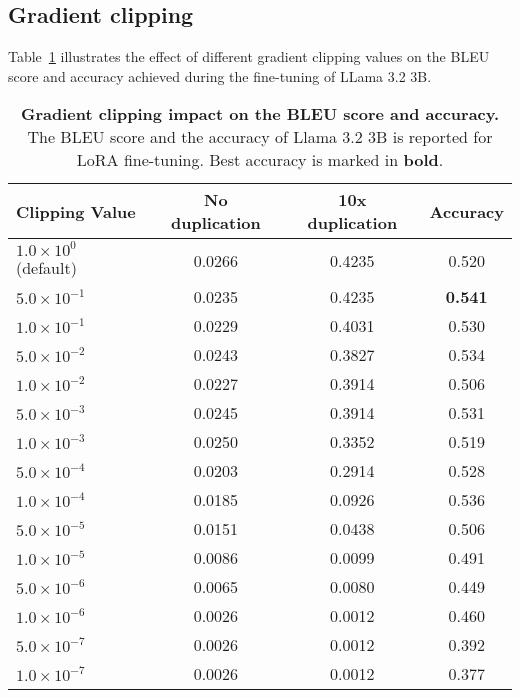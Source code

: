 \subsection{Gradient clipping}
\label{sec:gradclip}
Table~\ref{tab:gradient_clipping} illustrates the effect of different gradient clipping values on the BLEU score and accuracy achieved during the fine-tuning of LLama 3.2 3B.
\begin{table}[!htbp]
\caption{\textbf{Gradient clipping impact on the BLEU score and accuracy.} The BLEU score and the accuracy of Llama 3.2 3B is reported for LoRA fine-tuning. Best accuracy is marked in \textbf{bold}.}
\label{tab:gradient_clipping}
\vskip 0.15in
\begin{center}
\begin{scriptsize}
\begin{tabular}{@{}l|ccc@{}}
\toprule
Clipping Value & No duplication  & 10x duplication  & Accuracy       \\ \midrule
$1.0 \times 10^{0}$ (default) & 0.0266          & 0.4235           & 0.520          \\
$5.0 \times 10^{-1}$          & 0.0235          & 0.4235           & \textbf{0.541} \\
$1.0 \times 10^{-1}$          & 0.0229          & 0.4031           & 0.530          \\
$5.0 \times 10^{-2}$          & 0.0243          & 0.3827           & 0.534          \\
$1.0 \times 10^{-2}$          & 0.0227          & 0.3914           & 0.506          \\
$5.0 \times 10^{-3}$          & 0.0245          & 0.3914           & 0.531          \\
$1.0 \times 10^{-3}$          & 0.0250          & 0.3352           & 0.519          \\
$5.0 \times 10^{-4}$          & 0.0203          & 0.2914           & 0.528          \\
$1.0 \times 10^{-4}$          & 0.0185          & 0.0926           & 0.536          \\
$5.0 \times 10^{-5}$          & 0.0151          & 0.0438           & 0.506          \\
$1.0 \times 10^{-5}$          & 0.0086          & 0.0099           & 0.491          \\
$5.0 \times 10^{-6}$          & 0.0065          & 0.0080           & 0.449          \\
$1.0 \times 10^{-6}$          & 0.0026          & 0.0012           & 0.460          \\
$5.0 \times 10^{-7}$          & 0.0026          & 0.0012           & 0.392          \\
$1.0 \times 10^{-7}$          & 0.0026          & 0.0012           & 0.377          \\ 
\bottomrule
\end{tabular}
\end{scriptsize}
\end{center}
\vskip -0.1in
\end{table}


